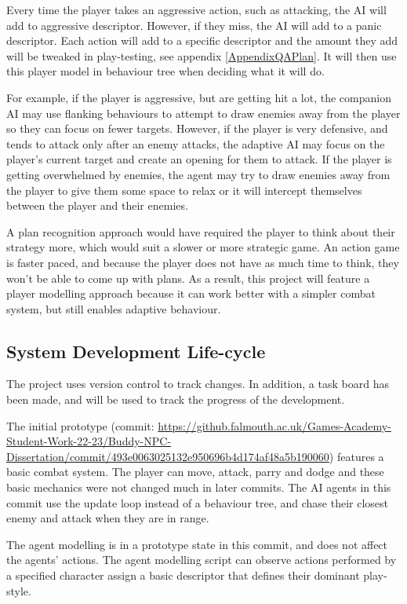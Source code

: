 \documentclass{IEEEtran}
\begin{document}
Every time the player takes an aggressive action, such as attacking, the AI will add to aggressive descriptor. However, if they miss, the AI will add to a panic descriptor. Each action will add to a specific descriptor and the amount they add will be tweaked in play-testing, see appendix \ref{AppendixQAPlan}. It will then use this player model in behaviour tree when deciding what it will do.

For example, if the player is aggressive, but are getting hit a lot, the companion AI may use flanking behaviours to attempt to draw enemies away from the player so they can focus on fewer targets. However, if the player is very defensive, and tends to attack only after an enemy attacks, the adaptive AI may focus on the player's current target and create an opening for them to attack. If the player is getting overwhelmed by enemies, the agent may try to draw enemies away from the player to give them some space to relax or it will intercept themselves between the player and their enemies.

A plan recognition approach would have required the player to think about their strategy more, which would suit a slower or more strategic game. An action game is faster paced, and because the player does not have as much time to think, they won't be able to come up with plans. As a result, this project will feature a player modelling approach because it can work better with a simpler combat system, but still enables adaptive behaviour.

\subsection{System Development Life-cycle}
\label{DevLifecycle}

The project uses version control to track changes. In addition, a task board has been made, and will be used to track the progress of the development.

The initial prototype (commit: \url{https://github.falmouth.ac.uk/Games-Academy-Student-Work-22-23/Buddy-NPC-Dissertation/commit/493e0063025132e950696b4d174af48a5b190060}) features a basic combat system. The player can move, attack, parry and dodge and these basic mechanics were not changed much in later commits. The AI agents in this commit use the update loop instead of a behaviour tree, and chase their closest enemy and attack when they are in range.

The agent modelling is in a prototype state in this commit, and does not affect the agents' actions. The agent modelling script can observe actions performed by a specified character assign a basic descriptor that defines their dominant play-style.
\end{document}

